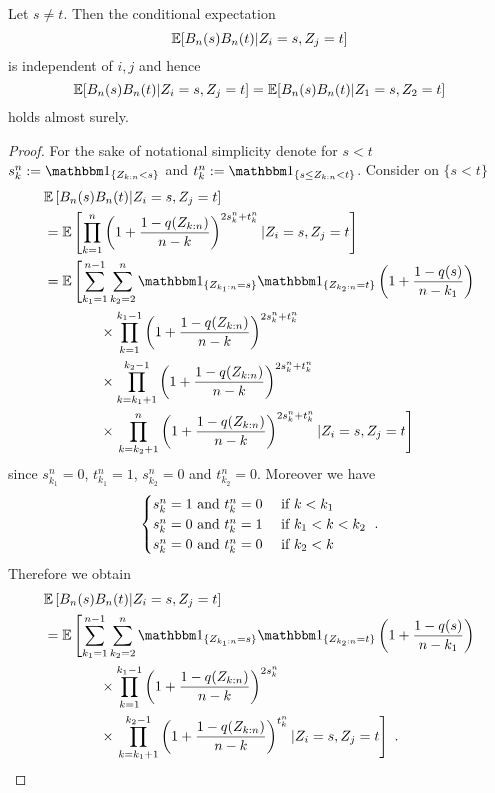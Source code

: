 \begin{lemma}
	\label{lem:bnbn_change_order}
	Let $s\neq t$. Then the conditional expectation 
	$$\mathbb{E}[B_n(s)B_n(t) | Z_i=s, Z_j=t]$$ 
	is independent of $i,j$ and hence
	$$\mathbb{E}[B_n(s)B_n(t) | Z_i=s, Z_j=t] = \mathbb{E}[B_n(s)B_n(t) | Z_1=s, Z_2=t]$$
	holds almost surely.
	\begin{proof}
	    For the sake of notational simplicity denote for $s<t$ $s_k^n := \I{Z_{k:n} < s}$ and $t_k^n := \I{s\leq Z_{k:n} < t}$. Consider on $\{s<t\}$ 
		\begin{align*}
			&\E\left[B_n(s)B_n(t)|Z_i=s, Z_j=t\right]\\
			&= \E\left[\prod_{k=1}^{n}\left(1+\frac{1-q(Z_{k:n})}{n-k}\right)^{2s_k^n + t_k^n} | Z_i=s, Z_j=t\right]\\
			&= \E\left[\sum_{k_1=1}^{n-1} \sum_{k_2=2}^{n} \I{Z_{k_1:n} = s} \I{Z_{k_2:n} = t}\left(1+\frac{1-q(s)}{n-k_1}\right)\right.\\ 
			&\qquad\qquad \times \prod_{k=1}^{k_1-1}\left(1+\frac{1-q(Z_{k:n})}{n-k}\right)^{2s_k^n + t_k^n} \\
			&\qquad\qquad \times \prod_{k=k_1+1}^{k_2-1}\left(1+\frac{1-q(Z_{k:n})}{n-k}\right)^{2s_k^n + t_k^n} \\
			&\qquad\qquad \times  \left.\prod_{k=k_2+1}^{n}\left(1+\frac{1-q(Z_{k:n})}{n-k}\right)^{2s_k^n + t_k^n} | Z_i=s, Z_j=t\right]
		\end{align*}
		since $s_{k_1}^n = 0$, $t_{k_1}^n=1$, $s_{k_2}^n = 0$ and $t_{k_2}^n=0$. Moreover we have 
		\[ \begin{cases} 
			s_{k}^n = 1 \textrm{ and } t_{k}^n = 0 & \textrm{ if } k < k_1  \\
			s_{k}^n = 0 \textrm{ and } t_{k}^n = 1 & \textrm{ if } k_1 < k < k_2\\
			s_{k}^n = 0 \textrm{ and } t_{k}^n = 0 & \textrm{ if } k_2 < k \\
			\end{cases}\textrm{ .}
		\]		
		Therefore we obtain
		\begin{align*}
			&\E\left[B_n(s)B_n(t)|Z_i=s, Z_j=t\right]\\
			&= \E\left[\sum_{k_1=1}^{n-1} \sum_{k_2=2}^{n} \I{Z_{k_1:n} = s} \I{Z_{k_2:n} = t}\left(1+\frac{1-q(s)}{n-k_1}\right)\right.\\ 
			&\qquad\qquad \times \prod_{k=1}^{k_1-1}\left(1+\frac{1-q(Z_{k:n})}{n-k}\right)^{2s_k^n} \\
			&\qquad\qquad \times \left. \prod_{k=k_1+1}^{k_2-1}\left(1+\frac{1-q(Z_{k:n})}{n-k}\right)^{t_k^n} | Z_i=s, Z_j=t\right]\mdot

\end{align*}
\end{proof}
\end{lemma}
